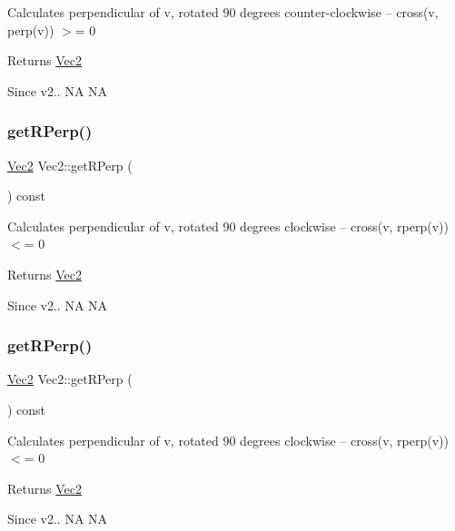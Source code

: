 Calculates perpendicular of v, rotated 90 degrees counter-\/clockwise -- cross(v, perp(v)) $>$= 0 \begin{DoxyReturn}{Returns}
\hyperlink{classVec2}{Vec2} 
\end{DoxyReturn}
\begin{DoxySince}{Since}
v2..  NA  NA 
\end{DoxySince}
\mbox{\label{classVec2_a3ae57753954a59e57d1ddaaa76b57485}} 
\subsubsection{\texorpdfstring{get\+R\+Perp()}{getRPerp()}\hspace{0.1cm}{\footnotesize\ttfamily [1/2]}}
{\footnotesize\ttfamily \hyperlink{classVec2}{Vec2} Vec2\+::get\+R\+Perp (\begin{DoxyParamCaption}{ }\end{DoxyParamCaption}) const\hspace{0.3cm}{\ttfamily [inline]}}

Calculates perpendicular of v, rotated 90 degrees clockwise -- cross(v, rperp(v)) $<$= 0 \begin{DoxyReturn}{Returns}
\hyperlink{classVec2}{Vec2} 
\end{DoxyReturn}
\begin{DoxySince}{Since}
v2..  NA  NA 
\end{DoxySince}
\mbox{\label{classVec2_a3ae57753954a59e57d1ddaaa76b57485}} 
\subsubsection{\texorpdfstring{get\+R\+Perp()}{getRPerp()}\hspace{0.1cm}{\footnotesize\ttfamily [2/2]}}
{\footnotesize\ttfamily \hyperlink{classVec2}{Vec2} Vec2\+::get\+R\+Perp (\begin{DoxyParamCaption}{ }\end{DoxyParamCaption}) const\hspace{0.3cm}{\ttfamily [inline]}}

Calculates perpendicular of v, rotated 90 degrees clockwise -- cross(v, rperp(v)) $<$= 0 \begin{DoxyReturn}{Returns}
\hyperlink{classVec2}{Vec2} 
\end{DoxyReturn}
\begin{DoxySince}{Since}
v2..  NA  NA 
\end{DoxySince}
\mbox{\label{classVec2_af2a542c6d0f65a8ba71ea1480d19d214}} 
